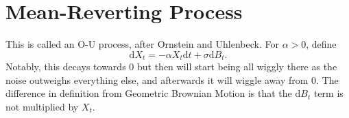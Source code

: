 \section{Mean-Reverting Process}
This is called an O-U process, after Ornstein and Uhlenbeck. For $\alpha>0$, define $$ \mathrm dX_t = -\alpha X_t\mathrm dt + \sigma\mathrm dB_t. $$ Notably, this decays towards 0 but then will start being all wiggly there as the noise outweighs everything else, and afterwards it will wiggle away from 0. The difference in definition from Geometric Brownian Motion is that the $\mathrm dB_t$ term is not multiplied by $X_t$.

